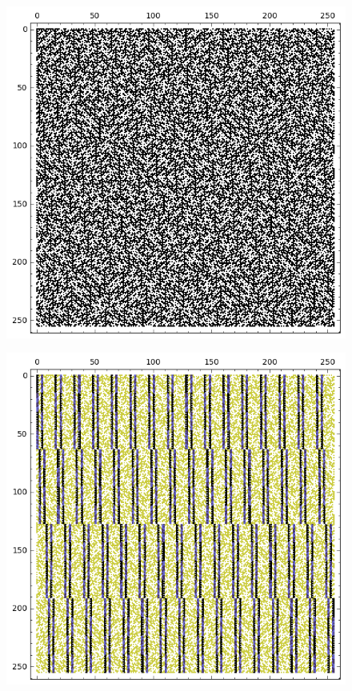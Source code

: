 \documentclass[12pt,a4paper]{article}
\begin{document}
\begin{figure}[!hb]
\centering
\begin{minipage}{.48\textwidth}
  \centering
  \includegraphics[width=.9\linewidth]{../matrix_plot/re8_8_weight_class_matrix.png}
  \label{fig:8_8_weight_class_matrix}
\end{minipage}%
\begin{minipage}{.48\textwidth}
  \centering
  \includegraphics[width=.9\linewidth]{../matrix_plot/re8_8_bent_cayley_graph_index_matrix.png}
  \label{fig:8_8_bent_cayley_graph_index_matrix}
\end{minipage}
\end{figure}
~
\end{document}
